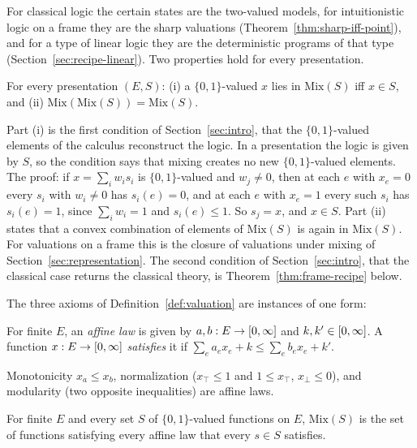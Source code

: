 \noindent
For classical logic the certain states are the two-valued models, for
intuitionistic logic on a frame they are the sharp valuations
(Theorem~\ref{thm:sharp-iff-point}), and for a type of linear logic they
are the deterministic programs of that type
(Section~\ref{sec:recipe-linear}). Two properties hold for every
presentation.

\begin{theorem}
\label{thm:mix-basic}
For every presentation $(E, S)$:
(i) a $\{0,1\}$-valued $x$ lies in $\mathrm{Mix}(S)$ iff $x \in S$, and
(ii) $\mathrm{Mix}(\mathrm{Mix}(S)) = \mathrm{Mix}(S)$.
\end{theorem}

\noindent
Part (i) is the first condition of Section~\ref{sec:intro}, that the
$\{0,1\}$-valued elements of the calculus reconstruct the logic. In a
presentation the logic is given by $S$, so the condition says that mixing
creates no new $\{0,1\}$-valued elements. The proof: if
$x = \sum_i w_i s_i$ is $\{0,1\}$-valued and $w_j \ne 0$, then at each
$e$ with $x_e = 0$ every $s_i$ with $w_i \ne 0$ has $s_i(e) = 0$, and at
each $e$ with $x_e = 1$ every such $s_i$ has $s_i(e) = 1$, since
$\sum_i w_i = 1$ and $s_i(e) \le 1$. So $s_j = x$, and $x \in S$.
Part (ii) states that a convex combination of elements of
$\mathrm{Mix}(S)$ is again in $\mathrm{Mix}(S)$. For valuations on a
frame this is the closure of valuations under mixing of
Section~\ref{sec:representation}.
The second condition of Section~\ref{sec:intro}, that the classical
case returns the classical theory, is Theorem~\ref{thm:frame-recipe}
below.

The three axioms of Definition~\ref{def:valuation} are instances of one
form:

\begin{definition}
\label{def:affine-law}
For finite $E$, an \emph{affine law} is given by $a, b : E \to [0,\infty]$
and $k, k' \in [0,\infty]$. A function $x : E \to [0,\infty]$ \emph{satisfies}
it if $\sum_e a_e x_e + k \le \sum_e b_e x_e + k'$.
\end{definition}

\noindent
Monotonicity $x_a \le x_b$, normalization ($x_\top \le 1$ and
$1 \le x_\top$, $x_\bot \le 0$), and modularity (two opposite
inequalities) are affine laws.

\begin{theorem}
\label{thm:mix-eq-laws}
For finite $E$ and every set $S$ of $\{0,1\}$-valued functions on $E$,
$\mathrm{Mix}(S)$ is the set of functions satisfying every affine law
that every $s \in S$ satisfies.
\end{theorem}

